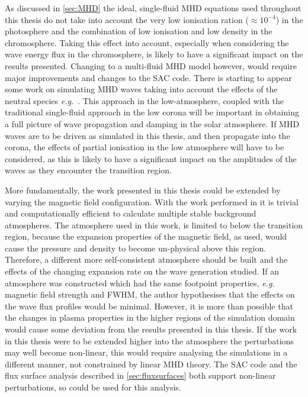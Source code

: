 As discussed in \cref{sec:MHD} the ideal, single-fluid MHD equations used throughout this thesis do not take into account the very low ionisation ration ($\approx 10^{-4}$) in the photosphere and the combination of low ionisation and low density in the chromosphere.
Taking this effect into account, especially when considering the wave energy flux in the chromosphere, is likely to have a significant impact on the results presented.
Changing to a multi-fluid MHD model however, would require major improvements and changes to the SAC code.
There is starting to appear some work on simulating MHD waves taking into account the effects of the neutral species \emph{e.g.}~\cite{shelyag2016}.
This approach in the low-atmosphere, coupled with the traditional single-fluid approach in the low corona will be important in obtaining a full picture of wave propagation and damping in the solar atmosphere.
If MHD waves are to be driven as simulated in this thesis, and then propagate into the corona, the effects of partial ionisation in the low atmosphere will have to be considered, as this is likely to have a significant impact on the amplitudes of the waves as they encounter the transition region.

More fundamentally, the work presented in this thesis could be extended by varying the magnetic field configuration.
With the work performed in \cite{gent2013,gent2014} it is trivial and computationally efficient to calculate multiple stable background atmospheres.
The atmosphere used in this work, is limited to below the transition region, because the expansion properties of the magnetic field, as used, would cause the pressure and density to become un-physical above this region.
Therefore, a different more self-consistent atmosphere should be built and the effects of the changing expansion rate on the wave generation studied.
If an atmosphere was constructed which had the same footpoint properties, \textit{e.g.} magnetic field strength and FWHM, the author hypothesises that the effects on the wave flux profiles would be minimal.
However, it is more than possible that the changes in plasma properties in the higher regions of the simulation domain would cause some deviation from the results presented in this thesis.
If the work in this thesis were to be extended higher into the atmosphere the perturbations may well become non-linear, this would require analysing the simulations in a different manner, not constrained by linear MHD theory.
The SAC code and the flux surface analysis described in \cref{sec:fluxsurfaces} both support non-linear perturbations, so could be used for this analysis.

